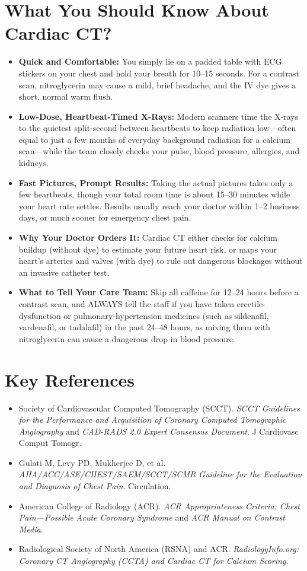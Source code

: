 \section{What You Should Know About Cardiac CT?}
\begin{itemize}
    \item \textbf{Quick and Comfortable:} You simply lie on a padded table with ECG stickers on your chest and hold your breath for 10--15 seconds. For a contrast scan, nitroglycerin may cause a mild, brief headache, and the IV dye gives a short, normal warm flush.
    \item \textbf{Low-Dose, Heartbeat-Timed X-Rays:} Modern scanners time the X-rays to the quietest split-second between heartbeats to keep radiation low---often equal to just a few months of everyday background radiation for a calcium scan---while the team closely checks your pulse, blood pressure, allergies, and kidneys.
    \item \textbf{Fast Pictures, Prompt Results:} Taking the actual pictures takes only a few heartbeats, though your total room time is about 15--30 minutes while your heart rate settles. Results usually reach your doctor within 1--2 business days, or much sooner for emergency chest pain.
    \item \textbf{Why Your Doctor Orders It:} Cardiac CT either checks for calcium buildup (without dye) to estimate your future heart risk, or maps your heart's arteries and valves (with dye) to rule out dangerous blockages without an invasive catheter test.
    \item \textbf{What to Tell Your Care Team:} Skip all caffeine for 12--24 hours before a contrast scan, and ALWAYS tell the staff if you have taken erectile-dysfunction or pulmonary-hypertension medicines (such as sildenafil, vardenafil, or tadalafil) in the past 24--48 hours, as mixing them with nitroglycerin can cause a dangerous drop in blood pressure.
\end{itemize}

\section{Key References}
\begin{itemize}
    \item Society of Cardiovascular Computed Tomography (SCCT). \textit{SCCT Guidelines for the Performance and Acquisition of Coronary Computed Tomographic Angiography} and \textit{CAD-RADS 2.0 Expert Consensus Document}. J Cardiovasc Comput Tomogr.
    \item Gulati M, Levy PD, Mukherjee D, et al. \textit{AHA/ACC/ASE/CHEST/SAEM/SCCT/SCMR Guideline for the Evaluation and Diagnosis of Chest Pain}. Circulation.
    \item American College of Radiology (ACR). \textit{ACR Appropriateness Criteria: Chest Pain---Possible Acute Coronary Syndrome} and \textit{ACR Manual on Contrast Media}.
    \item Radiological Society of North America (RSNA) and ACR. \textit{RadiologyInfo.org: Coronary CT Angiography (CCTA) and Cardiac CT for Calcium Scoring}.
\end{itemize}
